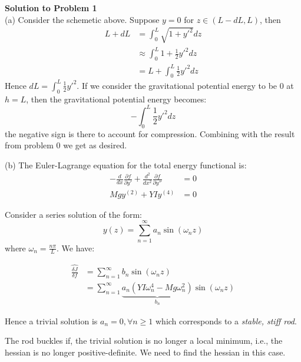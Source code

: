 \begin{framed}
\textbf{Solution to Problem 1}\\
(a) Consider the schemetic above. Suppose $y=0$ for $z\in (L -dL,L)$, then
\begin{equation}
\begin{aligned}
L+dL&=\int_0^L \sqrt{1+y'^2}dz \\ 
&\approx \int_0^L 1 + \frac{1}{2}y'^2dz\\
&= L + \int_0^L \frac{1}{2}y'^2dz
\end{aligned}
\end{equation}
Hence $dL=\int_0^L \frac{1}{2}y'^2$. If we consider the gravitational potential energy to be 0 at $h=L$, then the gravitational potential energy becomes:
\begin{equation}
-\int_0^L \frac{1}{2}y'^2dz
\end{equation}
the negative sign is there to account for compression. Combining with the result from problem 0 we get as desired.

(b) The Euler-Lagrange equation for the total energy functional is:
\begin{equation}
\begin{aligned}
-\frac{d}{dx}\frac{\partial f}{\partial y'}+\frac{d^2}{dx^2}\frac{\partial f}{\partial y''} &= 0 \\
Mgy^{(2)}+YIy^{(4)} &= 0
\end{aligned}
\end{equation}

Consider a series solution of the form:
\begin{equation}
y(z)=\sum_{n=1}^{\infty} a_n\sin(\omega_n z)
\end{equation}
where $\omega_n = \frac{n\pi}{L}$. We have:

\begin{equation}
\begin{aligned}
\widehat{\frac{\delta J}{\delta f}} &= \sum_{n=1}^{\infty}  b_n \sin(\omega_n z) \\
&= \sum_{n=1}^{\infty}\underbrace{a_n(YI\omega_n^4-Mg\omega_n^2)}_{b_n}\sin(\omega_n z)
\end{aligned}
\end{equation}

Hence a trivial solution is $a_n=0, \forall n\geq 1$ which corresponds to a \textit{stable, stiff rod}.

The rod buckles if, the trivial solution is no longer a local minimum, i.e., the hessian is no longer positive-definite. We need to find the hessian in this case.


\end{framed}
